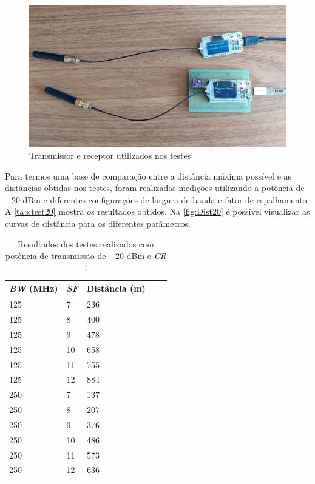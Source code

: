 \documentclass[
	12pt,				%
	openright,			%
	twoside,			%
	a4paper,			%
	english,			%
	french,				%
	spanish,			%
	brazil				%
	]{abntex2}
\begin{document}
\begin{figure}[H]
	\caption{\label{fig:Test}Transmissor e receptor utilizados nos testes}
	\begin{center}
	    \includegraphics[scale=0.35]{img/Test.jpg}
	\end{center}
\end{figure}

Para termos uma base de comparação entre a distância máxima possível e as distâncias obtidas nos testes, foram realizadas medições utilizando a potência de +20 dBm e diferentes configurações de largura de banda e fator de espalhamento. A \autoref{tab:test20} mostra os resultados obtidos. Na \autoref{fig:Dist20} é possível visualizar as curvas de distância para os diferentes parâmetros.

\begin{table}[H]
\centering
\caption{Resultados dos testes realizados com potência de transmissão de +20 dBm e \emph{CR} 1}
\label{tab:test20}
\begin{tabular}{|l|l|l|l|l|}
\hline
\textit{BW} (MHz) & \textit{SF} & Distância (m) \\ \hline
125 & 7 & 236 \\
125 & 8 & 400 \\
125 & 9 & 478 \\
125 & 10 & 658 \\
125 & 11 & 755 \\
125 & 12 & 884 \\ \hline
250 & 7 & 137 \\
250 & 8 & 207 \\
250 & 9 & 376 \\
250 & 10 & 486 \\
250 & 11 & 573 \\
250 & 12 & 636 \\ \hline
\end{tabular}
\end{table}
\end{document}
